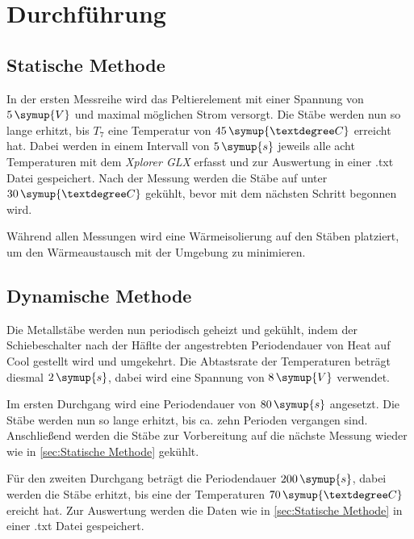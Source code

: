 \section{Durchführung}
\label{sec:Durchführung}

\subsection{Statische Methode}
\label{sec:Statische Methode}

In der ersten Messreihe wird das Peltierelement mit einer Spannung von $5\,\symup{V}$ und maximal möglichen Strom versorgt.
Die Stäbe werden nun so lange erhitzt, bis $T_{7}$ eine Temperatur von $45\,\symup{°C}$ erreicht hat.
Dabei werden in einem Intervall von $5\,\symup{s}$ jeweils alle acht Temperaturen mit dem \textit{Xplorer GLX}
erfasst und zur Auswertung in einer .txt Datei gespeichert.
Nach der Messung werden die Stäbe auf unter $30\,\symup{°C}$ gekühlt, bevor mit dem nächsten Schritt begonnen wird.

Während allen Messungen wird eine Wärmeisolierung auf den Stäben platziert, um den Wärmeaustausch mit der Umgebung zu minimieren.

\subsection{Dynamische Methode}
\label{sec:Dynamische Methode}

Die Metallstäbe werden nun periodisch geheizt und gekühlt, indem der Schiebeschalter nach der Häflte der angestrebten
Periodendauer von \glqq Heat\grqq{} auf \glqq Cool\grqq{} gestellt wird und umgekehrt.
Die Abtastsrate der Temperaturen beträgt diesmal $2\,\symup{s}$, dabei wird eine Spannung von $8\,\symup{V}$ verwendet.

Im ersten Durchgang wird eine Periodendauer von $80\,\symup{s}$ angesetzt. Die Stäbe werden nun so lange erhitzt,
bis ca. zehn Perioden vergangen sind.
Anschließend werden die Stäbe zur Vorbereitung auf die nächste Messung wieder wie in \autoref{sec:Statische Methode} gekühlt.

Für den zweiten Durchgang beträgt die Periodendauer $200\,\symup{s}$, dabei werden die Stäbe erhitzt, bis eine der Temperaturen
$70\,\symup{°C}$ ereicht hat. Zur Auswertung werden die Daten wie in \autoref{sec:Statische Methode} in einer .txt Datei gespeichert.